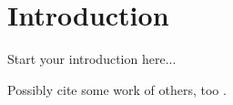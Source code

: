 \chapter{Introduction}
\label{ch:introduction}


Start your introduction here...

Possibly cite some work of others, too \citep{Adiku.ea:1995:USO}.